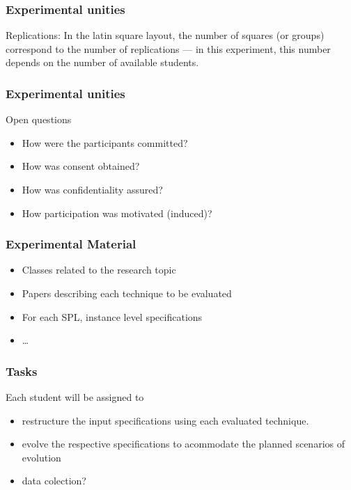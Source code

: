 \documentclass{beamer}
\begin{document}
\begin{frame}
\frametitle{Experimental unities}

\alert{Replications:} In the latin square layout, the number of squares (or
groups) correspond to the number of replications --- in this experiment, this number
depends on the number of available students.

\end{frame}

\begin{frame}
\frametitle{Experimental unities}

\begin{block}{Open questions}
\begin{itemize}
  \item How were the participants committed? 
  \item How was consent obtained? 
  \item How was confidentiality assured? 
  \item How participation was motivated (induced)? 
\end{itemize}
\end{block}

\end{frame}

\begin{frame}
\frametitle{Experimental Material}

\begin{itemize}
  \item Classes related to the research topic
  \item Papers describing each technique to be evaluated
  \item For each SPL, instance level specifications
  \item \ldots
\end{itemize}

\end{frame}

\begin{frame}
\frametitle{Tasks}
Each student will be assigned to 

\begin{itemize}
  \item restructure the input specifications using each evaluated technique.
  \item evolve the respective specifications to acommodate the planned scenarios of evolution
  \item data colection?
\end{itemize}

\end{frame}
\end{document}
